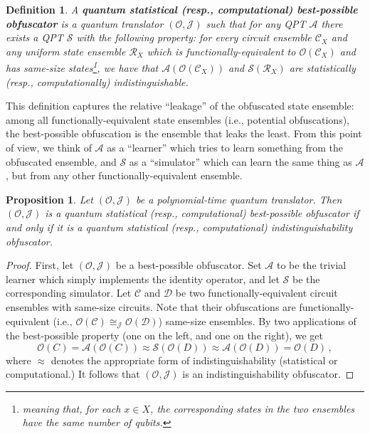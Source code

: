 \documentclass[11pt]{article}
\numberwithin{equation}{section}
\newtheorem{proposition}{Proposition}
\newtheorem{definition}{Definition}
\newcommand{\algo}{\mathcal}
\begin{document}
{\begin{definition}\label{def:best-possible}
A \textbf{quantum statistical (resp., computational) best-possible obfuscator} is a quantum translator $(\mathcal O, \mathcal J)$ such that for any QPT $\algo A$ there exists a QPT $\algo S$ with the following property: for every circuit ensemble $\mathcal C_X$ and any uniform state ensemble $\mathcal R_X$ which is functionally-equivalent to $\mathcal O(\mathcal C_X)$ and has same-size states\footnote{meaning that, for each $x \in X$, the corresponding states in the two ensembles have the same number of qubits.}, we have that $\algo A(\mathcal O(\mathcal C_X))$ and $\algo S(\mathcal R_X)$ are statistically (resp., computationally) indistinguishable.
\end{definition}

This definition captures the relative ``leakage'' of the obfuscated state ensemble: among all functionally-equivalent state ensembles (i.e., potential obfuscations), the best-possible obfuscation is the ensemble that leaks the least. From this point of view, we think of $\algo A$ as a ``learner'' which tries to learn something from the obfuscated ensemble, and $\algo S$ as a ``simulator'' which can learn the same thing as $\algo A$, but from any other functionally-equivalent ensemble.

\begin{proposition} Let $(\algo O, \algo J)$ be a polynomial-time quantum translator. Then $(\algo O, \algo J)$ is a quantum statistical (resp., computational) best-possible obfuscator if and only if it is a quantum statistical (resp., computational) indistinguishability obfuscator.
\end{proposition}
\begin{proof}
First, let $(\algo O, \algo J)$ be a best-possible obfuscator. Set $\mathcal A$ to be the trivial learner which simply implements the identity operator, and let $\mathcal S$  be the corresponding simulator. Let $\mathcal C$ and $\mathcal D$ be two functionally-equivalent circuit ensembles with same-size circuits. Note that their obfuscations are functionally-equivalent (i.e., $\algo O(\mathcal C) \cong_{\algo J} \algo O(\mathcal D)$) same-size ensembles. By two applications of the best-possible property (one on the left, and one on the right), we get
$$
\algo O(C) = \algo A(\algo O(C)) \approx \algo S(\algo O(D)) \approx \algo A(\algo O(D)) = \algo O(D)\,,
$$
where $\approx$ denotes the appropriate form of indistinguishability (statistical or computational.) It follows that $(\algo O, \algo J)$  is an indistinguishability obfuscator.


\end{proof}}
\end{document}
